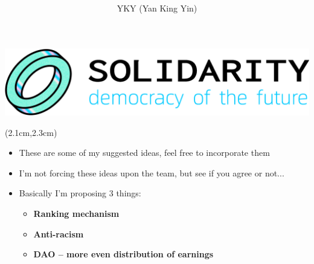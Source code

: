 \begin{preview}

\title{\vspace{-1cm} \bfseries\color{blue}{\LARGE Solidi coin - white paper}}

\author{YKY (Yan King Yin)} %

\centerline{\includegraphics[scale=0.3]{Solidarity-logo-0.png}}

\maketitle

\setcounter{section}{-1}
\setcounter{mypage}{0}

\begin{textblock*}{5cm}(2.1cm,2.3cm) %
{\color{red}{\large \textcircled{\small \themypage}}}
\addtocounter{mypage}{1}
\end{textblock*}

\begin{minipage}{\textwidth}
\setlength{\parskip}{0.4\baselineskip}

\begin{itemize}
	\item These are some of my suggested ideas, feel free to incorporate them

	\item I'm not forcing these ideas upon the team, but see if you agree or not...

	\item Basically I'm proposing 3 things:
	\begin{itemize}
			\item \textbf{Ranking mechanism}
			\item \textbf{Anti-racism}
			\item \textbf{DAO -- more even distribution of earnings}

	\end{itemize}
\end{itemize}

\end{minipage}
\end{preview}

